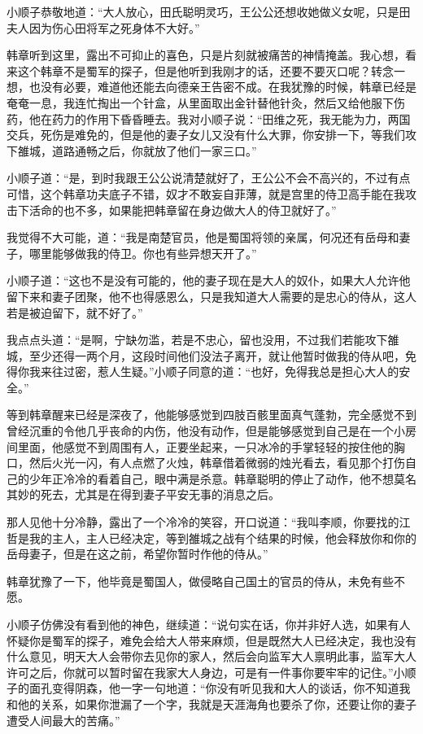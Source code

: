 小顺子恭敬地道：“大人放心，田氏聪明灵巧，王公公还想收她做义女呢，只是田夫人因为伤心田将军之死身体不大好。”

韩章听到这里，露出不可抑止的喜色，只是片刻就被痛苦的神情掩盖。我心想，看来这个韩章不是蜀军的探子，但是他听到我刚才的话，还要不要灭口呢？转念一想，也没有必要，难道他还能去向德亲王告密不成。在我犹豫的时候，韩章已经是奄奄一息，我连忙掏出一个针盒，从里面取出金针替他针灸，然后又给他服下伤药，他在药力的作用下昏昏睡去。我对小顺子说：“田维之死，我无能为力，两国交兵，死伤是难免的，但是他的妻子女儿又没有什么大罪，你安排一下，等我们攻下雒城，道路通畅之后，你就放了他们一家三口。”

小顺子道：“是，到时我跟王公公说清楚就好了，王公公不会不高兴的，不过有点可惜，这个韩章功夫底子不错，奴才不敢妄自菲薄，就是宫里的侍卫高手能在我攻击下活命的也不多，如果能把韩章留在身边做大人的侍卫就好了。”

我觉得不大可能，道：“我是南楚官员，他是蜀国将领的亲属，何况还有岳母和妻子，哪里能够做我的侍卫。你也有些异想天开了。”

小顺子道：“这也不是没有可能的，他的妻子现在是大人的奴仆，如果大人允许他留下来和妻子团聚，他不也得感恩么，只是我知道大人需要的是忠心的侍从，这人若是被迫留下，就不好了。”

我点点头道：“是啊，宁缺勿滥，若是不忠心，留也没用，不过我们若能攻下雒城，至少还得一两个月，这段时间他们没法子离开，就让他暂时做我的侍从吧，免得你我来往过密，惹人生疑。”小顺子同意的道：“也好，免得我总是担心大人的安全。”

等到韩章醒来已经是深夜了，他能够感觉到四肢百骸里面真气蓬勃，完全感觉不到曾经沉重的令他几乎丧命的内伤，他没有动作，但是能够感觉到自己是在一个小房间里面，他感觉不到周围有人，正要坐起来，一只冰冷的手掌轻轻的按住他的胸口，然后火光一闪，有人点燃了火烛，韩章借着微弱的烛光看去，看见那个打伤自己的少年正冷冷的看着自己，眼中满是杀意。韩章聪明的停止了动作，他不想莫名其妙的死去，尤其是在得到妻子平安无事的消息之后。

那人见他十分冷静，露出了一个冷冷的笑容，开口说道：“我叫李顺，你要找的江哲是我的主人，主人已经决定，等到雒城之战有个结果的时候，他会释放你和你的岳母妻子，但是在这之前，希望你暂时作他的侍从。”

韩章犹豫了一下，他毕竟是蜀国人，做侵略自己国土的官员的侍从，未免有些不愿。

小顺子仿佛没有看到他的神色，继续道：“说句实在话，你并非好人选，如果有人怀疑你是蜀军的探子，难免会给大人带来麻烦，但是既然大人已经决定，我也没有什么意见，明天大人会带你去见你的家人，然后会向监军大人禀明此事，监军大人许可之后，你就可以暂时留在我家大人身边，可是有一件事你要牢牢的记住。”小顺子的面孔变得阴森，他一字一句地道：“你没有听见我和大人的谈话，你不知道我和他的关系，如果你泄漏了一个字，我就是天涯海角也要杀了你，还要让你的妻子遭受人间最大的苦痛。”

